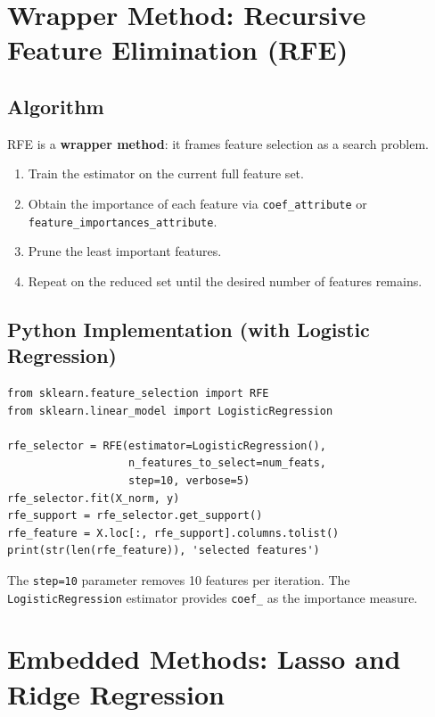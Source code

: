 \documentclass[11pt]{article}
\begin{document}
\newpage
\section{Wrapper Method: Recursive Feature Elimination (RFE)}

\subsection{Algorithm}
RFE is a \textbf{wrapper method}: it frames feature selection as a
search problem.

\begin{enumerate}
    \item Train the estimator on the current full feature set.
    \item Obtain the importance of each feature via
      \texttt{coef\_attribute} or \texttt{feature\_importances\_attribute}.
    \item Prune the least important features.
    \item Repeat on the reduced set until the desired number of
      features remains.
\end{enumerate}

\subsection{Python Implementation (with Logistic Regression)}
\begin{verbatim}
from sklearn.feature_selection import RFE
from sklearn.linear_model import LogisticRegression

rfe_selector = RFE(estimator=LogisticRegression(),
                   n_features_to_select=num_feats,
                   step=10, verbose=5)
rfe_selector.fit(X_norm, y)
rfe_support = rfe_selector.get_support()
rfe_feature = X.loc[:, rfe_support].columns.tolist()
print(str(len(rfe_feature)), 'selected features')
\end{verbatim}

The \texttt{step=10} parameter removes 10 features per iteration.
The \texttt{LogisticRegression} estimator provides \texttt{coef\_}
as the importance measure.


\newpage
\section{Embedded Methods: Lasso and Ridge Regression}
\end{document}
